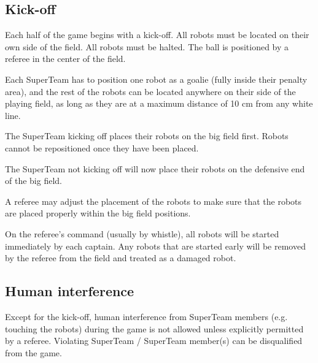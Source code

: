 \documentclass{article}
\begin{document}

\subsection{Kick-off \label{ref-004}}

Each half of the game begins with a kick-off. All robots must be located on
their own side of the field. All robots must be halted. The ball is positioned
by a referee in the center of the field.

Each SuperTeam has to position one robot as a goalie (fully inside their
penalty area), and the rest of the robots can be located anywhere on their side
of the playing field, as long as they are at a maximum distance of 10 cm from
any white line.

The SuperTeam kicking off places their robots on the big field first. Robots
cannot be repositioned once they have been placed.

The SuperTeam not kicking off will now place their robots on the defensive end
of the big field.

A referee may adjust the placement of the robots to make sure that the robots
are placed properly within the big field positions.


On the referee's command (usually by whistle), all robots will be started
immediately by each captain. Any robots that are started early will be removed
by the referee from the field and treated as a damaged robot.

\subsection{Human interference\label{ref-005}}

Except for the kick-off, human interference from SuperTeam members (e.g.
touching the robots) during the game is not allowed unless explicitly permitted
by a referee. Violating SuperTeam / SuperTeam member(s) can be disqualified from
the game.
\end{document}
